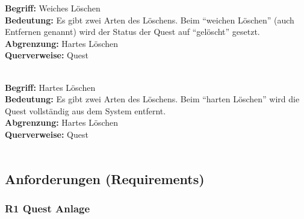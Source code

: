 \documentclass{article}
\begin{document}
\begin{samepage}
\textbf{Begriff:} Weiches Löschen \\
\textbf{Bedeutung:} Es gibt zwei Arten des Löschens. Beim ``weichen Löschen'' (auch Entfernen genannt) wird der Status der Quest auf ``gelöscht'' gesetzt.  \\
\textbf{Abgrenzung:} Hartes Löschen \\
\textbf{Querverweise:} Quest \\ \\
\end{samepage}

\begin{samepage}
\textbf{Begriff:} Hartes Löschen \\
\textbf{Bedeutung:} Es gibt zwei Arten des Löschens. Beim ``harten Löschen'' wird die Quest vollständig aus dem System entfernt.  \\
\textbf{Abgrenzung:} Hartes Löschen \\
\textbf{Querverweise:} Quest \\ \\
\end{samepage}

\subsection{Anforderungen (Requirements)}

\subsubsection{R1 Quest Anlage}
\end{document}
